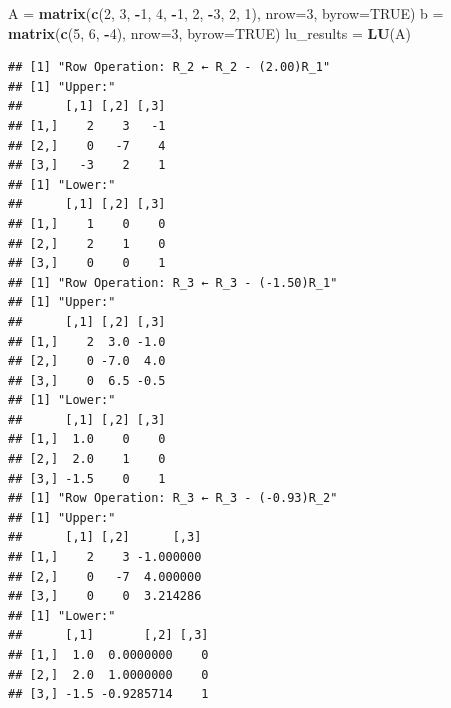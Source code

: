 \documentclass[
]{article}
\newenvironment{Shaded}{\begin{snugshade}}{\end{snugshade}}
\newcommand{\AttributeTok}[1]{\textcolor[rgb]{0.13,0.29,0.53}{#1}}
\newcommand{\ConstantTok}[1]{\textcolor[rgb]{0.56,0.35,0.01}{#1}}
\newcommand{\DecValTok}[1]{\textcolor[rgb]{0.00,0.00,0.81}{#1}}
\newcommand{\FunctionTok}[1]{\textcolor[rgb]{0.13,0.29,0.53}{\textbf{#1}}}
\newcommand{\NormalTok}[1]{#1}
\newcommand{\OtherTok}[1]{\textcolor[rgb]{0.56,0.35,0.01}{#1}}
\newcommand{\SpecialCharTok}[1]{\textcolor[rgb]{0.81,0.36,0.00}{\textbf{#1}}}
\begin{document}
\begin{Shaded}
\begin{Highlighting}[]
\NormalTok{A }\OtherTok{=} \FunctionTok{matrix}\NormalTok{(}\FunctionTok{c}\NormalTok{(}\DecValTok{2}\NormalTok{, }\DecValTok{3}\NormalTok{, }\SpecialCharTok{{-}}\DecValTok{1}\NormalTok{, }\DecValTok{4}\NormalTok{, }\SpecialCharTok{{-}}\DecValTok{1}\NormalTok{, }\DecValTok{2}\NormalTok{, }\SpecialCharTok{{-}}\DecValTok{3}\NormalTok{, }\DecValTok{2}\NormalTok{, }\DecValTok{1}\NormalTok{), }\AttributeTok{nrow=}\DecValTok{3}\NormalTok{, }\AttributeTok{byrow=}\ConstantTok{TRUE}\NormalTok{)}
\NormalTok{b }\OtherTok{=} \FunctionTok{matrix}\NormalTok{(}\FunctionTok{c}\NormalTok{(}\DecValTok{5}\NormalTok{, }\DecValTok{6}\NormalTok{, }\SpecialCharTok{{-}}\DecValTok{4}\NormalTok{), }\AttributeTok{nrow=}\DecValTok{3}\NormalTok{, }\AttributeTok{byrow=}\ConstantTok{TRUE}\NormalTok{)}
\NormalTok{lu\_results }\OtherTok{=} \FunctionTok{LU}\NormalTok{(A)}
\end{Highlighting}
\end{Shaded}

\begin{verbatim}
## [1] "Row Operation: R_2 ← R_2 - (2.00)R_1"
## [1] "Upper:"
##      [,1] [,2] [,3]
## [1,]    2    3   -1
## [2,]    0   -7    4
## [3,]   -3    2    1
## [1] "Lower:"
##      [,1] [,2] [,3]
## [1,]    1    0    0
## [2,]    2    1    0
## [3,]    0    0    1
## [1] "Row Operation: R_3 ← R_3 - (-1.50)R_1"
## [1] "Upper:"
##      [,1] [,2] [,3]
## [1,]    2  3.0 -1.0
## [2,]    0 -7.0  4.0
## [3,]    0  6.5 -0.5
## [1] "Lower:"
##      [,1] [,2] [,3]
## [1,]  1.0    0    0
## [2,]  2.0    1    0
## [3,] -1.5    0    1
## [1] "Row Operation: R_3 ← R_3 - (-0.93)R_2"
## [1] "Upper:"
##      [,1] [,2]      [,3]
## [1,]    2    3 -1.000000
## [2,]    0   -7  4.000000
## [3,]    0    0  3.214286
## [1] "Lower:"
##      [,1]       [,2] [,3]
## [1,]  1.0  0.0000000    0
## [2,]  2.0  1.0000000    0
## [3,] -1.5 -0.9285714    1
\end{verbatim}
\end{document}
